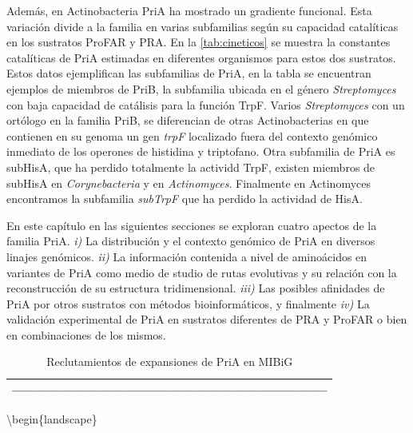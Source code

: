 \documentclass[12pt,twoside]{reedthesis}
\begin{document}
  Además, en Actinobacteria PriA ha mostrado un gradiente funcional. Esta
  variación divide a la familia en varias subfamilias según su capacidad
  catalíticas en los sustratos ProFAR y PRA. En la \autoref{tab:cineticos}
  se muestra la constantes catalíticas de PriA estimadas en diferentes
  organismos para estos dos sustratos. Estos datos ejemplifican las
  subfamilias de PriA, en la tabla se encuentran ejemplos de miembros de
  PriB, la subfamilia ubicada en el género \emph{Streptomyces} con baja
  capacidad de catálisis para la función TrpF. Varios \emph{Streptomyces}
  con un ortólogo en la familia PriB, se diferencian de otras
  Actinobacterias en que contienen en su genoma un gen \emph{trpF}
  localizado fuera del contexto genómico inmediato de los operones de
  histidina y triptofano. Otra subfamilia de PriA es subHisA, que ha
  perdido totalmente la actividd TrpF, existen miembros de subHisA en
  \emph{Corynebacteria} y en \emph{Actinomyces}. Finalmente en Actinomyces
  encontramos la subfamilia \emph{subTrpF} que ha perdido la actividad de
  HisA.
  
  En este capítulo en las siguientes secciones se exploran cuatro apectos
  de la familia PriA. \emph{i)} La distribución y el contexto genómico de
  PriA en diversos linajes genómicos. \emph{ii)} La información contenida
  a nivel de aminoácidos en variantes de PriA como medio de studio de
  rutas evolutivas y su relación con la reconstrucción de su estructura
  tridimensional. \emph{iii)} Las posibles afinidades de PriA por otros
  sustratos con métodos bioinformáticos, y finalmente \emph{iv)} La
  validación experimental de PriA en sustratos diferentes de PRA y ProFAR
  o bien en combinaciones de los mismos.
  
  \begin{longtable}[]{@{}l@{}}
  \caption{Reclutamientos de expansiones de PriA en MIBiG
  \label{tab:cineticos}}\tabularnewline
  \toprule
  --------------------------------------------------------------------------\tabularnewline
  \bottomrule
  \end{longtable}
  
  \clearpage    
  
  \textbackslash{}begin\{landscape\}
  
\end{document}
